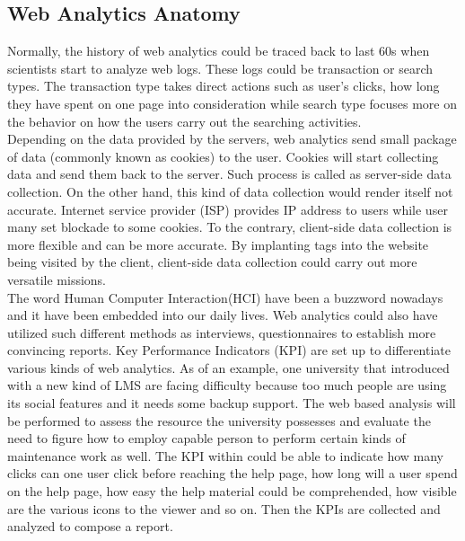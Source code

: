 \documentclass[sigconf]{acmart}
\begin{document}
\subsection{Web Analytics Anatomy}
Normally, the history of web analytics could be traced back to last 60s when scientists start to analyze web logs. These logs could be transaction or search types. The transaction type takes direct actions such as user's clicks, how long they have spent on one page into consideration while search type focuses more on the behavior on how the users carry out the searching activities. \\
Depending on the data provided by the servers, web analytics send small package of data (commonly known as cookies) to the user. Cookies will start collecting data and send them back to the server. Such process is called as server-side data collection. On the other hand, this kind of data collection would render itself not accurate. Internet service provider (ISP) provides IP address to users while user many set blockade to some cookies. To the contrary, client-side data collection is more flexible and can be more accurate. By implanting tags into the website being visited by the client, client-side data collection could carry out more versatile missions.\\
The word Human Computer Interaction(HCI) have been a buzzword nowadays and it have been embedded into our daily lives. Web analytics could also have utilized such different methods as interviews, questionnaires to establish more convincing reports. Key Performance Indicators (KPI) are set up to differentiate various kinds of web analytics. As of an example, one university that introduced with a new kind of LMS are facing difficulty because too much people are using its social features and it needs some backup support. The web based analysis will be performed to assess the resource the university possesses and evaluate the need to figure how to employ capable person to perform certain kinds of maintenance work as well. The KPI within could be able to indicate how many clicks can one user click before reaching the help page, how long will a user spend on the help page, how easy the help material could be comprehended, how visible are the various icons to the viewer and so on. Then the KPIs are collected and analyzed to compose a report\cite{Chughtai2013}.\\
\end{document}
